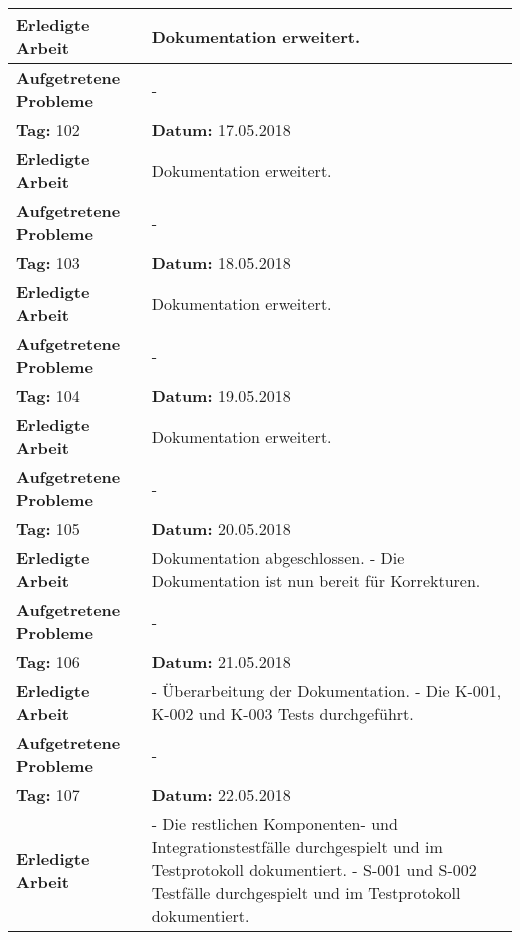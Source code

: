 \begin{longtable}{|p{5cm}|p{5cm}p{6cm}|}
\textbf{Erledigte Arbeit} & \multicolumn{2}{p{11cm}|}{Dokumentation erweitert.} \\ \hline
\textbf{Aufgetretene Probleme} & \multicolumn{2}{p{11cm}|}{-} \\ \hline
\rowcolor{heading}\textbf{Tag:} 102 & \textbf{Datum:} 17.05.2018 & \\ \hline
\textbf{Erledigte Arbeit} & \multicolumn{2}{p{11cm}|}{Dokumentation erweitert.} \\ \hline
\textbf{Aufgetretene Probleme} & \multicolumn{2}{p{11cm}|}{-} \\ \hline
\rowcolor{heading}\textbf{Tag:} 103 & \textbf{Datum:} 18.05.2018 & \\ \hline
\textbf{Erledigte Arbeit} & \multicolumn{2}{p{11cm}|}{Dokumentation erweitert.} \\ \hline
\textbf{Aufgetretene Probleme} & \multicolumn{2}{p{11cm}|}{-} \\ \hline
\rowcolor{heading}\textbf{Tag:} 104 & \textbf{Datum:} 19.05.2018 & \\ \hline
\textbf{Erledigte Arbeit} & \multicolumn{2}{p{11cm}|}{Dokumentation erweitert.} \\ \hline
\textbf{Aufgetretene Probleme} & \multicolumn{2}{p{11cm}|}{-} \\ \hline
\rowcolor{heading}\textbf{Tag:} 105 & \textbf{Datum:} 20.05.2018 & \\ \hline
\textbf{Erledigte Arbeit} & \multicolumn{2}{p{11cm}|}{Dokumentation abgeschlossen. \newline
- Die Dokumentation ist nun bereit für Korrekturen.} \\ \hline
\textbf{Aufgetretene Probleme} & \multicolumn{2}{p{11cm}|}{-} \\ \hline
\rowcolor{heading}\textbf{Tag:} 106 & \textbf{Datum:} 21.05.2018 & \\ \hline
\textbf{Erledigte Arbeit} & \multicolumn{2}{p{11cm}|}{- Überarbeitung der Dokumentation. \newline
- Die K-001, K-002 und K-003 Tests durchgeführt. } \\ \hline
\textbf{Aufgetretene Probleme} & \multicolumn{2}{p{11cm}|}{-} \\ \hline
\rowcolor{heading}\textbf{Tag:} 107 & \textbf{Datum:} 22.05.2018 & \\ \hline
\textbf{Erledigte Arbeit} & \multicolumn{2}{p{11cm}|}{- Die restlichen Komponenten- und Integrationstestfälle durchgespielt und im Testprotokoll dokumentiert.\newline 
- S-001 und S-002 Testfälle durchgespielt und im Testprotokoll dokumentiert.} \\ \hline

\end{longtable}
